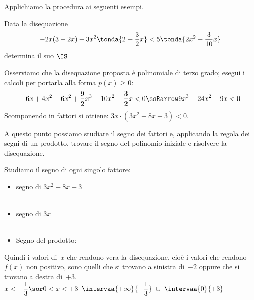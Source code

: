 Applichiamo la procedura ai seguenti esempi.


\begin{esempio}{}{}
Data la disequazione 
\[-2x(3-2x)-3x^2\tonda{2-\dfrac{3}{2}x} < 5\tonda{2x^2-\dfrac{3}{10}x}\] 
determina il suo \(\IS\)

Osserviamo che la disequazione proposta è polinomiale di terzo grado; 
esegui i calcoli per portarla alla forma \(p(x)\geqslant 0\): 
\[-6x +4x^2 -6x^2 +\dfrac{9}{2}x^3 -10x^2 +\dfrac{3}{2}x < 0
\ssRarrow
9x^3 -24x^2 -9x < 0\]
Scomponendo in fattori si ottiene: \(3x \cdot (3x^2-8x-3) < 0\). 

A questo punto possiamo studiare il segno dei fattori e, applicando la 
regola dei segni di un prodotto, trovare il segno del polinomio iniziale 
e risolvere la disequazione.

Studiamo il segno di ogni singolo fattore:
\begin{itemize}[left=0mm]
\item segno di \(3x^2-8x-3\)\\[-2mm]
\hspace*{-3mm}\\
\hspace*{-3mm}
\item  segno di \(3x\)\\%
\\
\item Segno del prodotto: \quad %
\raisebox{-10mm}
{
{\grrsegnoprodottob}}
\end{itemize}

Quindi i valori di~\(x\) che rendono vera la disequazione, cioè i 
valori che rendono~\(f(x)\) non positivo, sono quelli 
che si trovano a sinistra di~\(-2\) oppure che si trovano a destra 
di~\(+3\).\\
\inssol
   {\solprodottob}
   {\(x < -\dfrac{1}{3} \sor 0 < x < +3\)}
   {\(\intervaa{+\infty}{-\dfrac{1}{3}}~\cup~\intervaa{0}{+3}\)}
\end{esempio}

